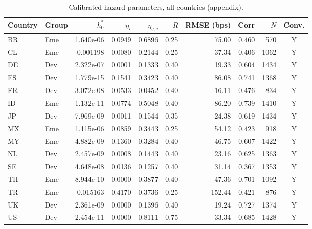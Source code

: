 \begin{table}[H]
\centering
\caption{Calibrated hazard parameters, all countries (appendix).}
\label{tab:appendix_full_parameters}
\begin{tabular}{llrrrrrrrc}
\toprule
Country & Group & $h_0^*$ & $\eta_i$ & $\eta_{g,i}$ & $R$ & RMSE (bps) & Corr & $N$ & Conv. \\
\midrule
BR & Eme & 1.640e-06 & 0.0949 & 0.6896 & 0.25 & 75.00 & 0.460 & 570 & Y \\
CL & Eme & 0.001198 & 0.0080 & 0.2144 & 0.25 & 37.34 & 0.406 & 1062 & Y \\
DE & Dev & 2.322e-07 & 0.0001 & 0.1333 & 0.40 & 19.33 & 0.604 & 1434 & Y \\
ES & Dev & 1.779e-15 & 0.1541 & 0.3423 & 0.40 & 86.08 & 0.741 & 1368 & Y \\
FR & Dev & 3.072e-08 & 0.0533 & 0.0452 & 0.40 & 16.11 & 0.476 & 834 & Y \\
ID & Eme & 1.132e-11 & 0.0774 & 0.5048 & 0.40 & 86.20 & 0.739 & 1410 & Y \\
JP & Dev & 7.969e-09 & 0.0011 & 0.1544 & 0.35 & 24.38 & 0.619 & 1434 & Y \\
MX & Eme & 1.115e-06 & 0.0859 & 0.3443 & 0.25 & 54.12 & 0.423 & 918 & Y \\
MY & Eme & 4.882e-09 & 0.1360 & 0.3284 & 0.40 & 46.75 & 0.607 & 1422 & Y \\
NL & Dev & 2.457e-09 & 0.0008 & 0.1443 & 0.40 & 23.16 & 0.625 & 1363 & Y \\
SE & Dev & 4.648e-08 & 0.0136 & 0.1257 & 0.40 & 31.14 & 0.367 & 1353 & Y \\
TH & Eme & 8.944e-10 & 0.0000 & 0.3877 & 0.40 & 47.36 & 0.701 & 1092 & Y \\
TR & Eme & 0.015163 & 0.4170 & 0.3736 & 0.25 & 152.44 & 0.421 & 876 & Y \\
UK & Dev & 2.361e-09 & 0.0000 & 0.1396 & 0.40 & 19.24 & 0.727 & 1374 & Y \\
US & Dev & 2.454e-11 & 0.0000 & 0.8111 & 0.75 & 33.34 & 0.685 & 1428 & Y \\
\bottomrule
\end{tabular}
\end{table}
